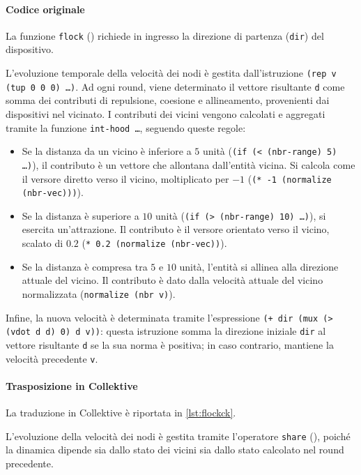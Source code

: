 \paragraph{Codice originale} La funzione \texttt{flock} () richiede in ingresso la direzione di partenza (\texttt{dir}) del dispositivo.
%

%
L'evoluzione temporale della velocità dei nodi è gestita dall'istruzione \texttt{(rep v (tup 0 0 0) \dots)}.
%
Ad ogni round, viene determinato il vettore risultante \texttt{d} come somma dei contributi di repulsione, coesione e allineamento, provenienti dai dispositivi nel vicinato.
%
I contributi dei vicini vengono calcolati e aggregati tramite la funzione \texttt{int-hood \dots}, seguendo queste regole:
\begin{itemize}
    \item Se la distanza da un vicino è inferiore a $5$ unità (\texttt{(if (< (nbr-range) 5) \dots)}), il contributo è un vettore che allontana dall'entità vicina. Si calcola come il versore diretto verso il vicino, moltiplicato per \(-1\) (\texttt{(* -1 (normalize (nbr-vec)))}).
    \item Se la distanza è superiore a $10$ unità (\texttt{(if (> (nbr-range) 10) \dots)}), si esercita un'attrazione. Il contributo è il versore orientato verso il vicino, scalato di $0.2$ (\texttt{* 0.2 (normalize (nbr-vec))}).
    \item Se la distanza è compresa tra $5$ e $10$ unità, l'entità si allinea alla direzione attuale del vicino. Il contributo è dato dalla velocità attuale del vicino normalizzata (\texttt{normalize (nbr v)}).
\end{itemize}
%
Infine, la nuova velocità è determinata tramite l’espressione \texttt{(+ dir (mux (> (vdot d d) 0) d v))}: questa istruzione somma la direzione iniziale \texttt{dir} al vettore risultante \texttt{d} se la sua norma è positiva; in caso contrario, mantiene la velocità precedente \texttt{v}.
\paragraph{Trasposizione in Collektive} La traduzione in Collektive è riportata in \cref{lst:flockck}.

L’evoluzione della velocità dei nodi è gestita tramite l’operatore \texttt{share} (), poiché la dinamica dipende sia dallo stato dei vicini sia dallo stato calcolato nel round precedente.

